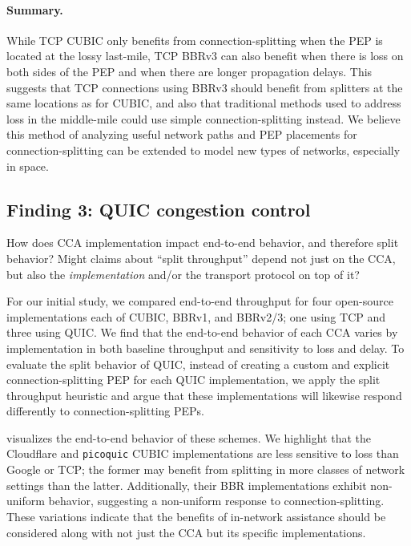 \paragraph{Summary.}
While TCP CUBIC only benefits from connection-splitting when the PEP is located
at the lossy last-mile, TCP BBRv3 can also benefit when there is loss on both
sides of the PEP and when there are longer propagation delays. This suggests
that TCP connections using BBRv3 should benefit from splitters at the same
locations as for CUBIC, and also that traditional methods used to
address loss in the middle-mile could use simple connection-splitting instead.
We believe this method of analyzing useful network paths and PEP placements for
connection-splitting can be extended to model new types of networks, especially
in space.

\subsection{Finding 3: QUIC congestion control}
\label{sec:splitting:results:finding3}




How does CCA implementation impact end-to-end behavior, and therefore split
behavior? Might claims about ``split throughput'' depend not just on the CCA,
but also the \textit{implementation} and/or the transport protocol
on top of it?

For our initial study, we compared end-to-end throughput for four open-source
implementations each of CUBIC, BBRv1, and BBRv2/3; one using TCP and three
using QUIC. We find that the end-to-end behavior of each CCA varies by
implementation in both baseline throughput and sensitivity to loss and delay.
To evaluate the split behavior of QUIC, instead of creating a custom and
explicit connection-splitting PEP for each QUIC implementation, we apply the
split throughput heuristic and argue that these implementations
will likewise respond differently to connection-splitting PEPs.

 visualizes the end-to-end behavior of these schemes.
We highlight that the Cloudflare and \texttt
 {picoquic} CUBIC implementations are less sensitive to loss than Google or
 TCP; the former may benefit from splitting in more classes of network settings
 than the latter. Additionally, their BBR implementations exhibit non-uniform
 behavior, suggesting a non-uniform response to
 connection-splitting. These variations indicate that the benefits of
 in-network assistance should be considered along with not just the CCA but its
 specific implementations.

